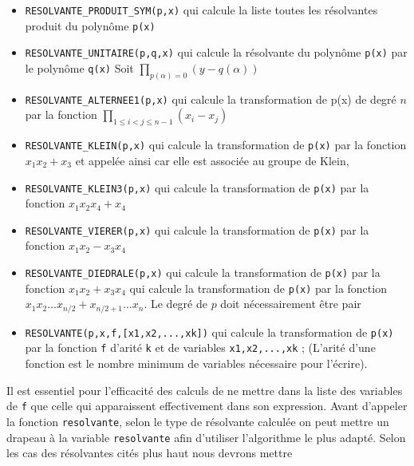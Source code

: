 \documentclass[11pt]{article}
\begin{document}
\begin{itemize}
\item {\tt RESOLVANTE\_PRODUIT\_SYM(p,x)} 
 qui calcule la liste toutes les 
r\'esolvantes produit du polyn\^ome {\tt p(x)}
\item {\tt RESOLVANTE\_UNITAIRE(p,q,x)} 
qui calcule la r\'esolvante du 
polyn\^ome {\tt p(x)} par le polyn\^ome {\tt q(x)}
Soit $\prod_{p(\alpha)=0}(y-q(\alpha))$
\item {\tt RESOLVANTE\_ALTERNEE1(p,x)} 
qui calcule la transformation de 
p(x) de degr\'e $n$ par la fonction $\prod_{1\leq i<j\leq n-1} (x_i-x_j)$
\item {\tt RESOLVANTE\_KLEIN(p,x)} 
qui calcule la transformation de
{\tt p(x)} par la fonction $x_1x_2+x_3$ et appel\'ee ainsi car elle
est associ\'ee au groupe de Klein,
\item {\tt RESOLVANTE\_KLEIN3(p,x)} qui calcule la transformation de
{\tt p(x)} par la fonction $x_1x_2x_4+x_4$
\item {\tt RESOLVANTE\_VIERER(p,x)} 
qui calcule la transformation de
{\tt p(x)} par la fonction $x_1x_2-x_3x_4$
\item {\tt RESOLVANTE\_DIEDRALE(p,x)} 
qui calcule la transformation de
{\tt p(x)} par la fonction $x_1x_2+x_3x_4$
  qui calcule la transformation de
{\tt p(x)} par la fonction $x_1x_2\ldots x_{n/2}+x_{n/2+1}\ldots x_n$.
Le degr\'e de $p$ doit n\'ecessairement \^etre pair
\item {\tt RESOLVANTE(p,x,f,[x1,x2,...,xk])} 
qui calcule la transformation de
{\tt p(x)} par la fonction {\tt f} d'arit\'e {\tt k} et de variables 
{\tt x1,x2,...,xk} ; (L'arit\'e d'une fonction est le nombre minimum de 
variables n\'ecessaire pour l'\'ecrire).


\end{itemize}
Il est essentiel pour
l'efficacit\'e des calculs de ne mettre dans la liste des variables de
{\tt f} que celle qui apparaissent effectivement dans son expression.
Avant d'appeler la fonction {\tt resolvante}, selon le type de
r\'esolvante calcul\'ee on peut mettre un drapeau \`a la
variable {\tt resolvante}
afin d'utiliser l'algorithme le plus adapt\'e.
Selon les cas des r\'esolvantes cit\'es plus haut nous devrons mettre
\end{document}
